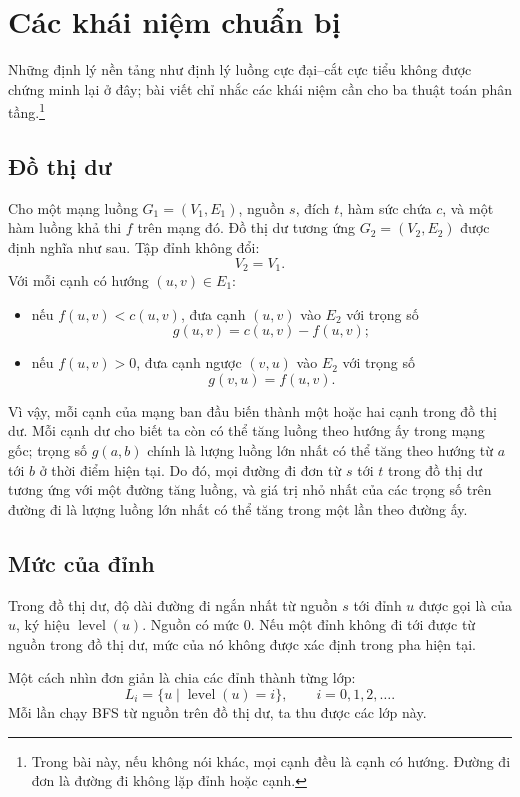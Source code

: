 \documentclass[11pt]{article}
\newcommand{\level}{\operatorname{level}}
\begin{document}
\section{Các khái niệm chuẩn bị}

Những định lý nền tảng như định lý luồng cực đại--cắt cực tiểu không được
chứng minh lại ở đây; bài viết chỉ nhắc các khái niệm cần cho ba thuật toán
phân tầng.\footnote{Trong bài này, nếu không nói khác, mọi cạnh đều là cạnh có
hướng. Đường đi đơn là đường đi không lặp đỉnh hoặc cạnh.}

\subsection{Đồ thị dư}

Cho một mạng luồng \(G_1=(V_1,E_1)\), nguồn \(s\), đích \(t\), hàm sức chứa
\(c\), và một hàm luồng khả thi \(f\) trên mạng đó. Đồ thị dư tương ứng
\(G_2=(V_2,E_2)\) được định nghĩa như sau. Tập đỉnh không đổi:
\[
  V_2=V_1.
\]
Với mỗi cạnh có hướng \((u,v)\in E_1\):
\begin{itemize}
  \item nếu \(f(u,v)<c(u,v)\), đưa cạnh \((u,v)\) vào \(E_2\) với trọng số
  \[
    g(u,v)=c(u,v)-f(u,v);
  \]
  \item nếu \(f(u,v)>0\), đưa cạnh ngược \((v,u)\) vào \(E_2\) với trọng số
  \[
    g(v,u)=f(u,v).
  \]
\end{itemize}

Vì vậy, mỗi cạnh của mạng ban đầu biến thành một hoặc hai cạnh trong đồ thị
dư. Mỗi cạnh dư cho biết ta còn có thể tăng luồng theo hướng ấy trong mạng
gốc; trọng số \(g(a,b)\) chính là lượng luồng lớn nhất có thể tăng theo hướng
từ \(a\) tới \(b\) ở thời điểm hiện tại. Do đó, mọi đường đi đơn từ \(s\) tới
\(t\) trong đồ thị dư tương ứng với một đường tăng luồng, và giá trị nhỏ nhất
của các trọng số trên đường đi là lượng luồng lớn nhất có thể tăng trong một
lần theo đường ấy.

\subsection{Mức của đỉnh}

Trong đồ thị dư, độ dài đường đi ngắn nhất từ nguồn \(s\) tới đỉnh \(u\) được
gọi là  của \(u\), ký hiệu \(\level(u)\). Nguồn có mức \(0\). Nếu
một đỉnh không đi tới được từ nguồn trong đồ thị dư, mức của nó không được
xác định trong pha hiện tại.

Một cách nhìn đơn giản là chia các đỉnh thành từng lớp:
\[
  L_i=\{u\mid \level(u)=i\},\qquad i=0,1,2,\ldots .
\]
Mỗi lần chạy BFS từ nguồn trên đồ thị dư, ta thu được các lớp này.
\end{document}
